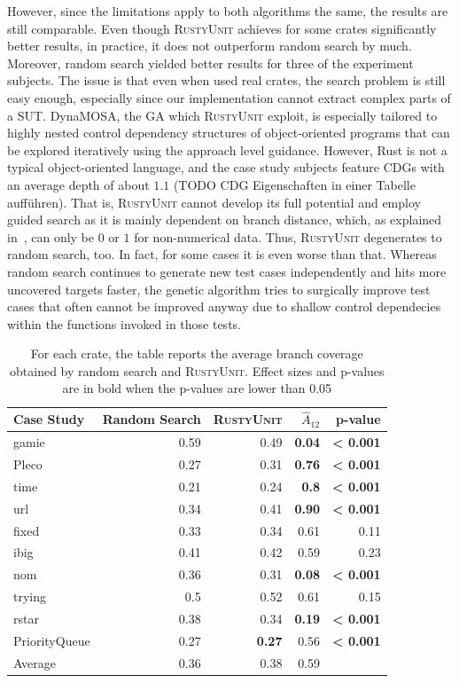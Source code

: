 \documentclass[paper=a4,%
  twoside,%
  BCOR4mm,%
  abstract=true,%
  toc=bibliography,%
  chapterprefix=true,%
  toc=bibliographynumbered,%
  open=right,%
  english,%
  pagesize=pdftex]{scrreprt}
\newcommand{\tech}{\textsc{RustyUnit}\xspace}
\newcommand{\cdgs}{\acp{CDG}\xspace}
\newcommand{\sut}{\ac{SUT}\xspace}
\begin{document}
However, since the limitations apply to both algorithms the same, the results are still comparable. Even though \tech achieves for some crates significantly better results, in practice, it does not outperform random search by much. Moreover, random search yielded better results for three of the experiment subjects. The issue is that even when used real crates, the search problem is still easy enough, especially since our implementation cannot extract complex parts of a \sut. \ac{DynaMOSA}, the \ac{GA} which \tech exploit, is especially tailored to highly nested control dependency structures of object-oriented programs that can be explored iteratively using the approach level guidance. However, Rust is not a typical object-oriented language, and the case study subjects feature \cdgs with an average depth of about $1.1$ (TODO CDG Eigenschaften in einer Tabelle aufführen). That is, \tech cannot develop its full potential and employ guided search as it is mainly dependent on branch distance, which, as explained in~, can only be $0$ or $1$ for non-numerical data. Thus, \tech degenerates to random search, too. In fact, for some cases it is even worse than that. Whereas random search continues to generate new test cases independently and hits more uncovered targets faster, the genetic algorithm tries to surgically improve test cases that often cannot be improved anyway due to shallow control dependecies within the functions invoked in those tests. 



\begin{table}[]
  \begin{tabular*}{\textwidth}{l @{\extracolsep{\fill}} rrrr}
  \hline
  \textbf{Case Study} & Random Search & \tech & \textbf{$\hat{A}_{12}$} & p-value \\
  \hline
  gamie & 0.59 & 0.49 & \textbf{0.04} & \textbf{< 0.001} \\
  Pleco & 0.27 & 0.31 & \textbf{0.76} & \textbf{< 0.001} \\
  time & 0.21 & 0.24 & \textbf{0.8} & \textbf{< 0.001} \\
  url & 0.34 & 0.41 & \textbf{0.90} & \textbf{< 0.001} \\
  fixed & 0.33 & 0.34 & 0.61 & 0.11 \\
  ibig & 0.41 & 0.42 & 0.59 & 0.23 \\
  nom & 0.36 & 0.31 & \textbf{0.08} & \textbf{< 0.001} \\
  trying & 0.5 & 0.52 & 0.61 & 0.15 \\
  rstar & 0.38 & 0.34 & \textbf{0.19} & \textbf{< 0.001} \\
  PriorityQueue & 0.27 & \textbf{0.27} & 0.56 & \textbf{< 0.001} \\
  \hline
  Average & 0.36 & 0.38 & 0.59 & \\
  \hline
  \end{tabular*}
\caption{\label{tab:results-ru-rs-coverage}For each crate, the table reports the average branch coverage obtained by random search and \tech. Effect sizes and p-values are in bold when the p-values are lower than 0.05}
\end{table}
\end{document}
